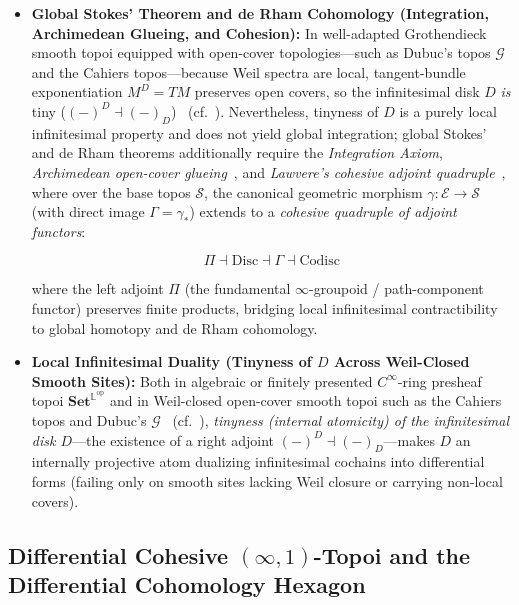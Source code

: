 \documentclass[10pt,twoside,openright]{book}
\theoremstyle{crmplain}
\theoremstyle{crmdef}
\theoremstyle{crmremark}
\begin{document}
\begin{enumerate}[label=\textbf{\arabic*.},leftmargin=1.8em]
  \begin{itemize}[leftmargin=1.5em]

    \item \textbf{Global Stokes' Theorem and de Rham Cohomology (Integration, Archimedean Glueing, and Cohesion):} In well-adapted Grothendieck smooth topoi equipped with open-cover topologies---such as Dubuc's topos $\mathcal{G}$ and the Cahiers topos---because Weil spectra are local, tangent-bundle exponentiation $M^D = TM$ preserves open covers, so the infinitesimal disk $D$ \emph{is} tiny ($(-)^D \dashv (-)_D$)~\cite[Ch.~III, Thm.~1.10 \& \S 2]{MoerdijkReyes91} (cf.~\cite{Kock06}). Nevertheless, tinyness of $D$ is a purely local infinitesimal property and does not yield global integration; global Stokes' and de Rham theorems additionally require the \emph{Integration Axiom}, \emph{Archimedean open-cover glueing}~\cite{MoerdijkReyes91}, and \emph{Lawvere's cohesive adjoint quadruple}~\cite{Lawvere07,Schreiber13}, where over the base topos $\mathcal{S}$, the canonical geometric morphism $\gamma: \mathcal{E} \to \mathcal{S}$ (with direct image $\Gamma = \gamma_*$) extends to a \emph{cohesive quadruple of adjoint functors}:

\[
  \Pi \dashv \mathrm{Disc} \dashv \Gamma \dashv \mathrm{Codisc}
\]

where the left adjoint $\Pi$ (the fundamental $\infty$-groupoid / path-component functor) preserves finite products, bridging local infinitesimal contractibility to global homotopy and de Rham cohomology.

    \item \textbf{Local Infinitesimal Duality (Tinyness of $D$ Across Weil-Closed Smooth Sites):} Both in algebraic or finitely presented $C^\infty$-ring presheaf topoi $\mathbf{Set}^{\mathbb{L}^{\mathrm{op}}}$ and in Weil-closed open-cover smooth topoi such as the Cahiers topos and Dubuc's $\mathcal{G}$~\cite[Ch.~III, Thm.~1.10 \& \S 2]{MoerdijkReyes91} (cf.~\cite{Kock06}), \emph{tinyness (internal atomicity) of the infinitesimal disk $D$}---the existence of a right adjoint $(-)^D \dashv (-)_D$---makes $D$ an internally projective atom dualizing infinitesimal cochains into differential forms (failing only on smooth sites lacking Weil closure or carrying non-local covers).

  \end{itemize}

\end{enumerate}

\subsection{\texorpdfstring{Differential Cohesive $(\infty, 1)$-Topoi and the Differential Cohomology Hexagon}{Differential Cohesive (infinity, 1)-Topoi and the Differential Cohomology Hexagon}}
\end{document}
